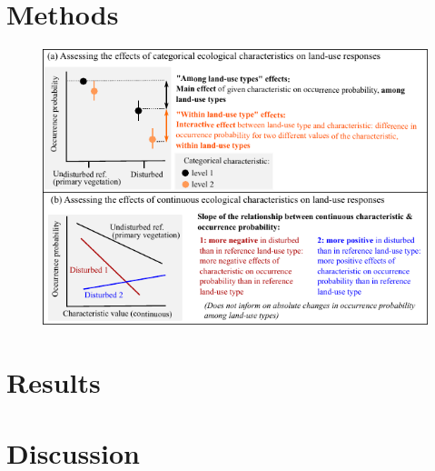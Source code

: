 \clearpage

\section{Methods}

\begin{figure}[h!]
\centering
\includegraphics[scale=1.7]{figures/Chapter4/Figure2}
\caption[]{}
\label{chap4_fig2}
\end{figure}


\section{Results}

\section{Discussion}
